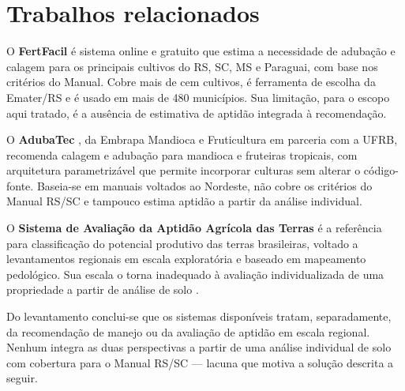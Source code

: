 \section{Trabalhos relacionados}

O \textbf{FertFacil} \citep{Tiecher2016} é sistema online e gratuito que estima a
necessidade de adubação e calagem para os principais cultivos do RS, SC, MS e Paraguai,
com base nos critérios do Manual. Cobre mais de cem cultivos, é ferramenta de escolha da
Emater/RS e é usado em mais de 480 municípios. Sua limitação, para o escopo aqui
tratado, é a ausência de estimativa de aptidão integrada à recomendação.

O \textbf{AdubaTec} \citep{AdubaTec2021}, da Embrapa Mandioca e Fruticultura em parceria
com a UFRB, recomenda calagem e adubação para mandioca e fruteiras tropicais, com
arquitetura parametrizável que permite incorporar culturas sem alterar o código-fonte.
Baseia-se em manuais voltados ao Nordeste, não cobre os critérios do Manual RS/SC e
tampouco estima aptidão a partir da análise individual.

O \textbf{Sistema de Avaliação da Aptidão Agrícola das Terras}
\citep{EmbrapaAptidao2025} é a referência para classificação do potencial produtivo das
terras brasileiras, voltado a levantamentos regionais em escala exploratória e baseado
em mapeamento pedológico. Sua escala o torna inadequado à avaliação individualizada de
uma propriedade a partir de análise de solo \citep{Hofig2015}.

Do levantamento conclui-se que os sistemas disponíveis tratam, separadamente, da
recomendação de manejo ou da avaliação de aptidão em escala regional. Nenhum integra as
duas perspectivas a partir de uma análise individual de solo com cobertura para o Manual
RS/SC --- lacuna que motiva a solução descrita a seguir.

